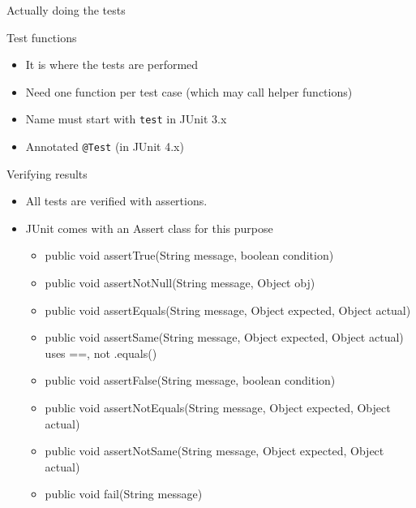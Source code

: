 \begin{frame}{Actually doing the tests}
  \begin{block}{Test functions}
    \begin{itemize}
    \item It is where the tests are performed
    \item Need one function per test case (which may call helper functions)

    \item Name must start with \texttt{test} in JUnit 3.x
    \item Annotated \texttt{@Test} (in JUnit 4.x)
    \end{itemize}
  \end{block}\vspace{-.5\baselineskip}

  \begin{block}{Verifying results}
    \begin{itemize}
    \item All tests are verified with assertions.
    \item JUnit comes with an Assert class for this purpose
      \begin{itemize}
      \item public void assertTrue(String message, boolean condition)
      \item public void assertNotNull(String message, Object obj)
      \item public void assertEquals(String message, Object expected, Object actual)
      \item public void assertSame(String message, Object expected, Object
        actual)\\
        uses ==, not .equals()        
      \item public void assertFalse(String message, boolean condition)
      \item public void assertNotEquals(String message, Object expected, Object actual)
      \item public void assertNotSame(String message, Object expected, Object actual)
      \item public void fail(String message)
      \end{itemize}
    \end{itemize}
  \end{block}
\end{frame}
